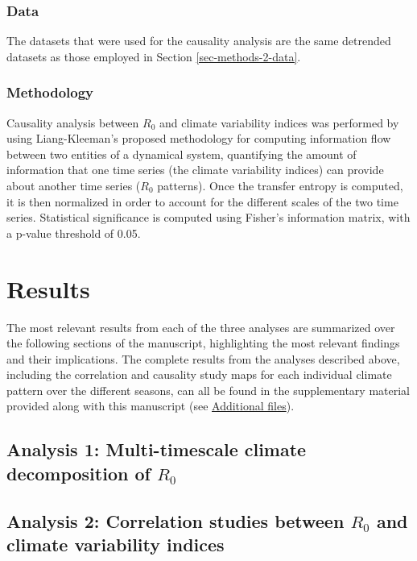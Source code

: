 \documentclass[article,10pt,twocolumn]{wlscirep}
\begin{document}
\subsubsection{Data} \label{sec-methods-3-data}

The datasets that were used for the causality analysis are the same detrended datasets as those employed in Section \ref{sec-methods-2-data}.

\subsubsection{Methodology} \label{sec-methods-3-methodology}

Causality analysis between $R_0$ and climate variability indices was performed by using Liang-Kleeman's proposed methodology for computing information flow between two entities of a dynamical system, quantifying the amount of information that one time series (the climate variability indices) can provide about another time series ($R_0$ patterns). Once the transfer entropy is computed, it is then normalized in order to account for the different scales of the two time series. Statistical significance is computed using Fisher's information matrix, with a p-value threshold of 0.05.

\section{Results}

The most relevant results from each of the three analyses are summarized over the following sections of the manuscript, highlighting the most relevant findings and their implications. The complete results from the analyses described above, including the correlation and causality study maps for each individual climate pattern over the different seasons, can all be found in the supplementary material provided along with this manuscript (see \hyperref[sec-additional-files]{Additional files}).


  \subsection{Analysis 1: Multi-timescale climate decomposition of $R_0$} \label{sec-results-1}

  \subsection{Analysis 2: Correlation studies between $R_0$ and climate variability indices} \label{sec-results-2} \label{sec-results-2}
\end{document}
